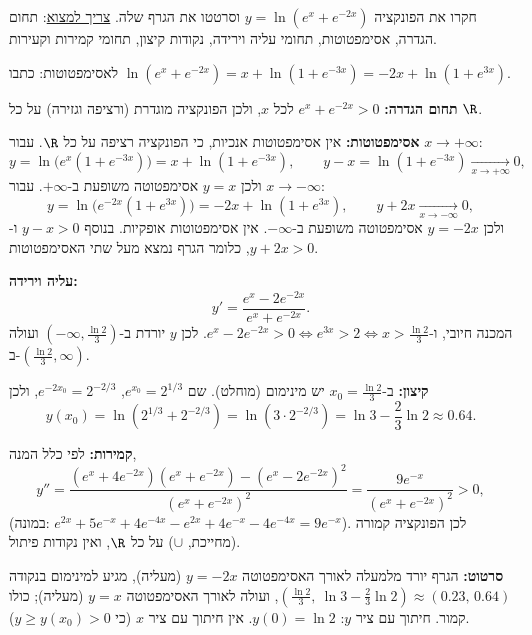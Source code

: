 
\begin{question}
חקרו את הפונקציה $y=\ln(e^x+e^{-2x})$ וסרטטו את הגרף שלה.
\underline{צריך למצוא}: תחום הגדרה, אסימפטוטות, תחומי עליה וירידה, נקודות קיצון, תחומי קמירות וקעירות.
\end{question}

\begin{hint}
לאסימפטוטות: כתבו $\ln(e^x+e^{-2x})=x+\ln(1+e^{-3x})=-2x+\ln(1+e^{3x})$.
\end{hint}

\begin{solution}
\textbf{תחום הגדרה:} $e^x+e^{-2x}>0$ לכל $x$, ולכן הפונקציה מוגדרת (ורציפה וגזירה) על כל $\R$.

\textbf{אסימפטוטות:} אין אסימפטוטות אנכיות, כי הפונקציה רציפה על כל $\R$.
עבור $x\to+\infty$:
\[
y=\ln\big(e^x(1+e^{-3x})\big)=x+\ln(1+e^{-3x}),\qquad y-x=\ln(1+e^{-3x})\xrightarrow[x\to+\infty]{}0,
\]
ולכן $y=x$ אסימפטוטה משופעת ב-$+\infty$.
עבור $x\to-\infty$:
\[
y=\ln\big(e^{-2x}(1+e^{3x})\big)=-2x+\ln(1+e^{3x}),\qquad y+2x\xrightarrow[x\to-\infty]{}0,
\]
ולכן $y=-2x$ אסימפטוטה משופעת ב-$-\infty$. אין אסימפטוטות אופקיות. בנוסף $y-x>0$ ו-$y+2x>0$, כלומר הגרף נמצא מעל שתי האסימפטוטות.

\textbf{עליה וירידה:}
\[
y'=\frac{e^x-2e^{-2x}}{e^x+e^{-2x}}.
\]
המכנה חיובי, ו-$e^x-2e^{-2x}>0\iff e^{3x}>2\iff x>\frac{\ln2}{3}$.
לכן $y$ יורדת ב-$\left(-\infty,\frac{\ln 2}{3}\right)$ ועולה ב-$\left(\frac{\ln2}{3},\infty\right)$.

\textbf{קיצון:} ב-$x_0=\frac{\ln2}{3}$ יש מינימום (מוחלט). שם $e^{x_0}=2^{1/3}$, $e^{-2x_0}=2^{-2/3}$, ולכן
\[
y(x_0)=\ln\left(2^{1/3}+2^{-2/3}\right)=\ln\left(3\cdot2^{-2/3}\right)=\ln3-\frac23\ln2\approx0.64.
\]

\textbf{קמירות:} לפי כלל המנה,
\[
y''=\frac{(e^x+4e^{-2x})(e^x+e^{-2x})-(e^x-2e^{-2x})^2}{(e^x+e^{-2x})^2}
=\frac{9e^{-x}}{(e^x+e^{-2x})^2}>0,
\]
(במונה: $e^{2x}+5e^{-x}+4e^{-4x}-e^{2x}+4e^{-x}-4e^{-4x}=9e^{-x}$). לכן הפונקציה קמורה (מחייכת, $\cup$) על כל $\R$, ואין נקודות פיתול.

\textbf{סרטוט:} הגרף יורד מלמעלה לאורך האסימפטוטה $y=-2x$ (מעליה), מגיע למינימום בנקודה $\left(\frac{\ln2}{3},\ \ln3-\frac23\ln2\right)\approx(0.23,\,0.64)$, ועולה לאורך האסימפטוטה $y=x$ (מעליה); כולו קמור. חיתוך עם ציר $y$: $y(0)=\ln2$. אין חיתוך עם ציר $x$ (כי $y\ge y(x_0)>0$).
\end{solution}
